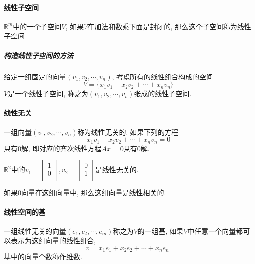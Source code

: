 \paragraph{线性子空间}
$\mathbb{R}^{m}$中的一个子空间$V$, 如果$V$在加法和数乘下面是封闭的, 那么这个子空间称为线性子空间.
\subparagraph{构造线性子空间的方法}
给定一组固定的向量$(v_1,v_2, \cdots ,v_n)$, 考虑所有的线性组合构成的空间
\begin{equation}
  V = \{ x_1 v_1 + x_2v_2 + \cdots + x_n v_n \}
\end{equation}
$V$是一个线性子空间, 称之为$(v_1, v_2, \cdots , v_n)$张成的线性子空间.

\paragraph{线性无关}
\begin{definition}
    一组向量$(v_1,v_2, \cdots, v_n)$称为线性无关的, 如果下列的方程
    \begin{equation}
      x_1v_1+x_2v_2+ \cdots  +x_n v_n = 0
    \end{equation}
    只有$0$解, 即对应的齐次线性方程$Ax=0$只有$0$解.
\end{definition}

\begin{example}
    $\mathbb{R}^{2}$中的$v_1 = \begin{bmatrix}
     1\\
     0\\
    \end{bmatrix}, v_2 = \begin{bmatrix}
     0\\
     1\\
    \end{bmatrix}$是线性无关的.
\end{example}

\begin{example}
    如果$0$向量在这组向量中, 那么这组向量是线性相关的.
\end{example}

\paragraph{线性空间的基}
\begin{definition}
    一组线性无关的向量$(e_1,e_2, \cdots , e_m)$称之为$V$的一组基, 如果$V$中任意一个向量都可以表示为这组向量的线性组合,
    \begin{equation}
      v = x_1e_1+x_2e_2+ \cdots  + x_n e_n.
    \end{equation}
    基中的向量个数称作维数.
\end{definition}

